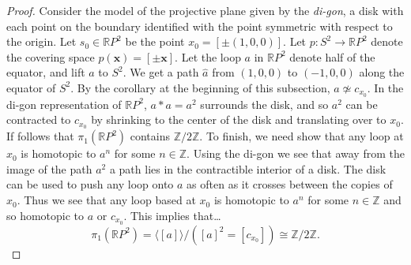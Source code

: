 \begin{proof}
Consider the model of the projective plane given by the \emph{di-gon}, a disk with each point on the boundary identified with the point symmetric with respect to the origin. Let $s_0 \in \mathbb{R}P^2$
be the point $x_0 = [\pm(1,0,0)].$ Let $p : S^2 \rightarrow \mathbb{R}P^2$ denote the covering space $p(\textbf{x}) = [\pm \textbf{x}]$. Let the loop $a$ in $\mathbb{R}P^2$ denote half of the equator, and
lift $a$ to $S^2$. We get a path $\hat{a}$ from $(1,0,0)$ to $(-1,0,0)$ along the equator of $S^2$. By the corollary at the beginning of this subsection, $a \not \simeq c_{x_0}$. In the di-gon representation of $\mathbb{R}P^2$,
$a * a = a^2$ surrounds the disk, and so $a^2$ can be contracted to $c_{x_0}$ by shrinking to the center of the disk and translating over to $x_0$. If follows that $\pi_1(\mathbb{R}P^2)$ contains $\mathbb{Z}/2\mathbb{Z}$. To finish, we need
show that any loop at $x_0$ is homotopic to $a^n$ for some $n \in \mathbb{Z}$. Using the di-gon we see that away from the image of the path $a^2$ a path lies in the contractible interior of a disk. The disk can be used
to push any loop onto $a$ as often as it crosses between the copies of $x_0$. Thus we see that any loop based at $x_0$ is homotopic to $a^n$ for some $n \in \mathbb{Z}$ and so homotopic to $a$ or $c_{x_0}$. This implies that\dots
$$\pi_1(\mathbb{R}P^2) = \langle [a] \rangle/([a]^2 = [c_{x_0}]) \cong \mathbb{Z}/2\mathbb{Z}.$$
\end{proof}